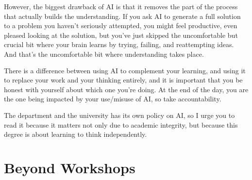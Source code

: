 However, the biggest drawback of AI is that it removes the part of the process that actually builds the understanding. If you ask AI to generate a full solution to a problem you haven't seriously attempted, you might feel productive, even pleased looking at the solution, but you've just skipped the uncomfortable but crucial bit where your brain learns by trying, failing, and reattempting ideas. And that's the uncomfortable bit where understanding takes place. 

There is a difference between using AI to complement your learning, and using it to replace your work and your thinking entirely, and it is important that you be honest with yourself about which one you're doing. At the end of the day, you are the one being impacted by your use/misuse of AI, so take accountability. 

The department and the university has its own policy on AI, so I urge you to read it because it matters not only due to academic integrity, but because this degree is about learning to think independently. 


\section{Beyond Workshops}



